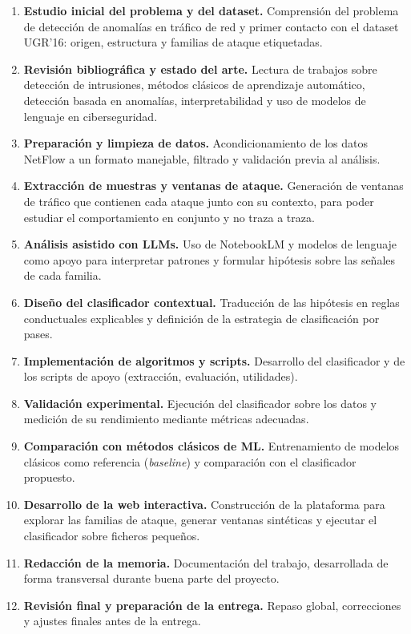\begin{enumerate}
  \item \textbf{Estudio inicial del problema y del dataset.} Comprensión del problema de detección de anomalías en tráfico de red y primer contacto con el dataset UGR'16: origen, estructura y familias de ataque etiquetadas.
  \item \textbf{Revisión bibliográfica y estado del arte.} Lectura de trabajos sobre detección de intrusiones, métodos clásicos de aprendizaje automático, detección basada en anomalías, interpretabilidad y uso de modelos de lenguaje en ciberseguridad.
  \item \textbf{Preparación y limpieza de datos.} Acondicionamiento de los datos NetFlow a un formato manejable, filtrado y validación previa al análisis.
  \item \textbf{Extracción de muestras y ventanas de ataque.} Generación de ventanas de tráfico que contienen cada ataque junto con su contexto, para poder estudiar el comportamiento en conjunto y no traza a traza.
  \item \textbf{Análisis asistido con LLMs.} Uso de NotebookLM y modelos de lenguaje como apoyo para interpretar patrones y formular hipótesis sobre las señales de cada familia.
  \item \textbf{Diseño del clasificador contextual.} Traducción de las hipótesis en reglas conductuales explicables y definición de la estrategia de clasificación por pases.
  \item \textbf{Implementación de algoritmos y scripts.} Desarrollo del clasificador y de los scripts de apoyo (extracción, evaluación, utilidades).
  \item \textbf{Validación experimental.} Ejecución del clasificador sobre los datos y medición de su rendimiento mediante métricas adecuadas.
  \item \textbf{Comparación con métodos clásicos de ML.} Entrenamiento de modelos clásicos como referencia (\textit{baseline}) y comparación con el clasificador propuesto.
  \item \textbf{Desarrollo de la web interactiva.} Construcción de la plataforma para explorar las familias de ataque, generar ventanas sintéticas y ejecutar el clasificador sobre ficheros pequeños.
  \item \textbf{Redacción de la memoria.} Documentación del trabajo, desarrollada de forma transversal durante buena parte del proyecto.
  \item \textbf{Revisión final y preparación de la entrega.} Repaso global, correcciones y ajustes finales antes de la entrega.
\end{enumerate}

